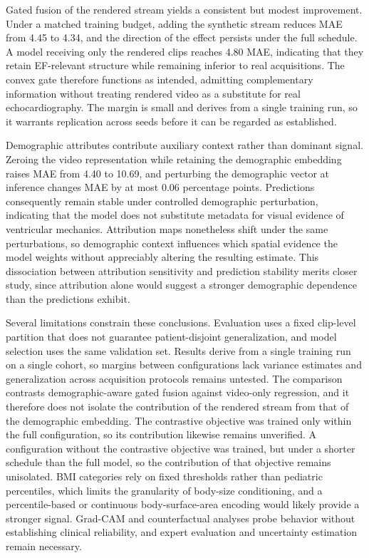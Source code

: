 \documentclass{ws-procs11x85}
\begin{document}
Gated fusion of the rendered stream yields a consistent but modest improvement.
Under a matched training budget, adding the synthetic stream reduces MAE from 4.45 to 4.34, and the direction of the effect persists under the full schedule.
A model receiving only the rendered clips reaches 4.80 MAE, indicating that they retain EF-relevant structure while remaining inferior to real acquisitions.
The convex gate therefore functions as intended, admitting complementary information without treating rendered video as a substitute for real echocardiography.
The margin is small and derives from a single training run, so it warrants replication across seeds before it can be regarded as established.

Demographic attributes contribute auxiliary context rather than dominant signal.
Zeroing the video representation while retaining the demographic embedding raises MAE from 4.40 to 10.69, and perturbing the demographic vector at inference changes MAE by at most 0.06 percentage points.
Predictions consequently remain stable under controlled demographic perturbation, indicating that the model does not substitute metadata for visual evidence of ventricular mechanics.
Attribution maps nonetheless shift under the same perturbations, so demographic context influences which spatial evidence the model weights without appreciably altering the resulting estimate.
This dissociation between attribution sensitivity and prediction stability merits closer study, since attribution alone would suggest a stronger demographic dependence than the predictions exhibit.

Several limitations constrain these conclusions.
Evaluation uses a fixed clip-level partition that does not guarantee patient-disjoint generalization, and model selection uses the same validation set.
Results derive from a single training run on a single cohort, so margins between configurations lack variance estimates and generalization across acquisition protocols remains untested.
The comparison contrasts demographic-aware gated fusion against video-only regression, and it therefore does not isolate the contribution of the rendered stream from that of the demographic embedding.
{\color{blue}The contrastive objective was trained only within the full configuration, so its contribution likewise remains unverified.}
{\color{red}A configuration without the contrastive objective was trained, but under a shorter schedule than the full model, so the contribution of that objective remains unisolated.}
BMI categories rely on fixed thresholds rather than pediatric percentiles, which limits the granularity of body-size conditioning, and a percentile-based or continuous body-surface-area encoding would likely provide a stronger signal.\cite{lopez2017zscores}
Grad-CAM and counterfactual analyses probe behavior without establishing clinical reliability, and expert evaluation and uncertainty estimation remain necessary.
\end{document}
